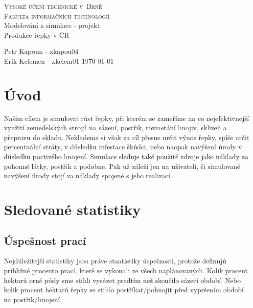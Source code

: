 \documentclass[11pt,a4paper,titlepage]{article}
\begin{document}
\begin{titlepage}
\begin{center}
    {\LARGE\textsc{Vysoké učení technické v~Brně}}\\
    \smallskip
    {\Large\textsc{Fakulta informačních technologií}}\\
    \bigskip
    \LARGE{Modelování a simulace - projekt}\\
    \smallskip
    \Huge{Produkce řepky v ČR}\\
\end{center}
    {\Large Petr Kapoun - xkapou04 \\ Erik Kelemen - xkelem01 \hfill \today }
\end{titlepage}

\tableofcontents
\newpage


\section{Úvod}
Našim cílem je simulovat rúst řepky, při kterém se zameříme na co nejefektivnejší využití zemedelských strojú na sázení, postřik, rozmetání hnojiv, sklizeň a přepravu do skladu. Neklademe si však za cíl přesne určit výnos řepky, spíše určit percentuální stráty, v dúsledku infestace škúdci, nebo naopak navýšení úrody v dúsledku poctivého hnojení. Simulace sleduje také použité zdroje jako náklady za pohonné látky, postřik a podobne. Pak už záleží jen na uživateli, či simulované navýšení úrody stojí za náklady spojené s jeho realizací.









\section{Sledované statistiky}
\subsection{Úspešnost prací}
Nejdúležitejší statistiky jsou práve staatistiky úspešnosti, protože definujú približné procento prací, které se vykonali ze všech naplánovaných. Kolik procent hektarú orné púdy sme stihli vysázet predtím než skončilo sázecí období. Nebo kolik procent hektarú řepky se stihlo postříkat/pohnojit před vypršením období na postřik/hnojení.
\end{document}
